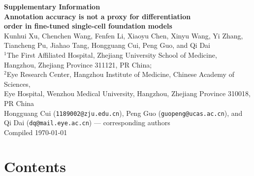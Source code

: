 \documentclass[12pt,a4paper]{article}
\begin{document}
\thispagestyle{empty}
\begin{center}
  \vspace*{3cm}
  {\LARGE\bfseries Supplementary Information}\\[1.5cm]
  {\Large\bfseries Annotation accuracy is not a proxy for differentiation\\[4pt]
   order in fine-tuned single-cell foundation models}\\[1.5cm]
  {\large Kunhui Xu, Chenchen Wang, Fenfen Li, Xiaoyu Chen, Xinyu Wang, Yi Zhang,\\
   Tiancheng Pu, Jiahao Tang, Hongguang Cui, Peng Guo, and Qi Dai}\\[0.5cm]
  {\large $^{1}$The First Affiliated Hospital, Zhejiang University School of Medicine,\\
   Hangzhou, Zhejiang Province 311121, PR China;\\
   $^{2}$Eye Research Center, Hangzhou Institute of Medicine, Chinese Academy of Sciences,\\
   Eye Hospital, Wenzhou Medical University, Hangzhou, Zhejiang Province 310018, PR China}\\[0.5cm]
  {\large Hongguang Cui (\texttt{1189002@zju.edu.cn}), Peng Guo (\texttt{guopeng@ucas.ac.cn}), and\\
   Qi Dai (\texttt{dq@mail.eye.ac.cn}) --- corresponding authors}\\[1.5cm]
  {\large Compiled \today}\\[2cm]
  \end{center}
\newpage

\section*{Contents}
\end{document}
